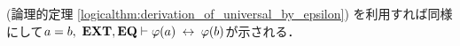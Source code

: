 \begin{sketch}
\begin{description}
\begin{description}
						(論理的定理
						\ref{logicalthm:derivation_of_universal_by_epsilon})
						を利用すれば同様にして$a = b,\ \mbox{{\bf EXT}},\mbox{{\bf EQ}} \vdash 
						\varphi(a) \hspace{0.25em}\leftrightarrow\hspace{0.25em} \varphi(b)$が示される．
						\QED
				\end{description}
				

\end{description}
\end{sketch}
